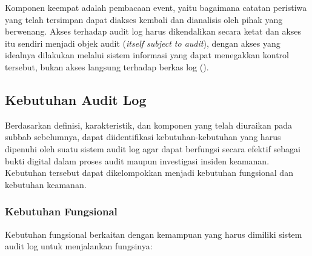 Komponen keempat adalah pembacaan event, yaitu bagaimana catatan
peristiwa yang telah tersimpan dapat diakses kembali dan dianalisis
oleh pihak yang berwenang. Akses terhadap audit log harus dikendalikan
secara ketat dan akses itu sendiri menjadi objek audit
(\textit{itself subject to audit}), dengan akses yang idealnya
dilakukan melalui sistem informasi yang dapat menegakkan kontrol
tersebut, bukan akses langsung terhadap berkas log (\cite{iso27789_2021}).

\subsection{Kebutuhan Audit Log}
\label{subsec:kebutuhan-audit-log}

Berdasarkan definisi, karakteristik, dan komponen yang telah diuraikan
pada subbab sebelumnya, dapat diidentifikasi kebutuhan-kebutuhan yang
harus dipenuhi oleh suatu sistem audit log agar dapat berfungsi secara
efektif sebagai bukti digital dalam proses audit maupun investigasi
insiden keamanan. Kebutuhan tersebut dapat dikelompokkan menjadi
kebutuhan fungsional dan kebutuhan keamanan.

\subsubsection{Kebutuhan Fungsional}

Kebutuhan fungsional berkaitan dengan kemampuan yang harus dimiliki
sistem audit log untuk menjalankan fungsinya:

